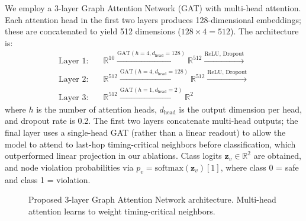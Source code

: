 \documentclass[10pt,twocolumn,journal]{IEEEtran}
\begin{document}
We employ a 3-layer Graph Attention Network (GAT) with multi-head attention. Each attention head in the first two layers produces 128-dimensional embeddings; these are concatenated to yield 512 dimensions ($128 \times 4 = 512$). The architecture is:
\begin{equation}
\begin{aligned}
\text{Layer 1:} \quad & \mathbb{R}^{10} \xrightarrow{\text{GAT}(h=4, d_{\text{head}}=128)} \mathbb{R}^{512} \xrightarrow{\text{ReLU, Dropout}} \\
\text{Layer 2:} \quad & \mathbb{R}^{512} \xrightarrow{\text{GAT}(h=4, d_{\text{head}}=128)} \mathbb{R}^{512} \xrightarrow{\text{ReLU, Dropout}} \\
\text{Layer 3:} \quad & \mathbb{R}^{512} \xrightarrow{\text{GAT}(h=1, d_{\text{head}}=2)} \mathbb{R}^{2}
\end{aligned}
\label{eq:architecture}
\end{equation}
where $h$ is the number of attention heads, $d_{\text{head}}$ is the output dimension per head, and dropout rate is 0.2. The first two layers concatenate multi-head outputs; the final layer uses a single-head GAT (rather than a linear readout) to allow the model to attend to last-hop timing-critical neighbors before classification, which outperformed linear projection in our ablations. Class logits $\mathbf{z}_v \in \mathbb{R}^2$ are obtained, and node violation probabilities via $p_v = \text{softmax}(\mathbf{z}_v)[1]$, where class 0 = safe and class 1 = violation.

\begin{figure}[t]
\centering
{}
\caption{Proposed 3-layer Graph Attention Network architecture. Multi-head attention learns to weight timing-critical neighbors.}
\label{fig:gat_arch}
\end{figure}
\end{document}
